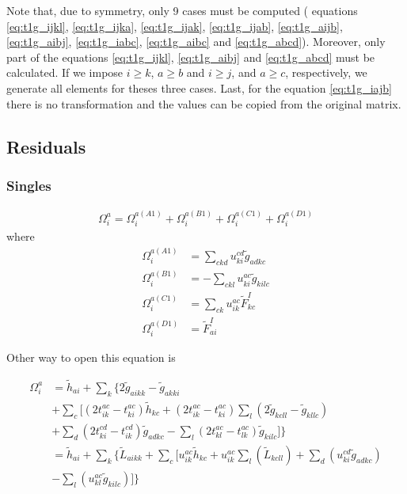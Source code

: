 Note that, due to symmetry, only 9 cases must be computed ( equations \ref{eq:t1g_ijkl}, \ref{eq:t1g_ijka}, \ref{eq:t1g_ijak}, \ref{eq:t1g_ijab}, \ref{eq:t1g_aijb}, \ref{eq:t1g_aibj}, \ref{eq:t1g_iabc}, \ref{eq:t1g_aibc} and \ref{eq:t1g_abcd}).
Moreover, only part of the equations \ref{eq:t1g_ijkl}, \ref{eq:t1g_aibj} and \ref{eq:t1g_abcd} must be calculated.
If we impose $i\ge k$, $a\ge b$ and $i\ge j$, and $a\ge c$, respectively, we generate all elements for theses three cases.
Last, for the equation \ref{eq:t1g_iajb} there is no transformation and the values can be copied from the original matrix.


\subsection{Residuals}
\hypertarget{sec:ccsd_res}{}
\label{sec:ccsd_res}

\subsubsection{Singles}
\hypertarget{sec:ccsd_res_sing}{}
\label{sec:ccsd_res_sing}


\begin{equation}
  \begin{split}
    \Omega_i^a=\Omega_i^{a(A1)}+\Omega_i^{a(B1)}+\Omega_i^{a(C1)}+\Omega_i^{a(D1)}
  \end{split}
\end{equation}
where
\begin{align}
  \Omega_i^{a(A1)}&=\sum_{ckd}u_{ki}^{cd}{\tilde g}_{adkc}\\
  \Omega_i^{a(B1)}&=-\sum_{ckl}u_{ki}^{ac}{\tilde g}_{kilc}\\
  \Omega_i^{a(C1)}&=\sum_{ck}u_{ik}^{ac}{\tilde F}_{kc}^{I}\\
  \Omega_i^{a(D1)}&={\tilde F}_{ai}^{I}
\end{align}

Other way to open this equation is

\begin{equation}
  \begin{split}
    \Omega_i^a&={\tilde h}_{ai}+\sum_k\{2{\tilde g}_{aikk}-{\tilde g}_{akki}\\
    &+\sum_c[(2t_{ik}^{ac}-t_{ki}^{ac}){\tilde h}_{kc}+(2t_{ik}^{ac}-t_{ki}^{ac})\sum_l(2{\tilde g}_{kcll}-{\tilde g}_{kllc})\\
    &+\sum_d(2t_{ki}^{cd}-t_{ik}^{cd}){\tilde g}_{adkc}-\sum_l(2t_{kl}^{ac}-t_{lk}^{ac}){\tilde g}_{kilc}]\}\\
    &={\tilde h}_{ai}+\sum_{k}\{{\tilde L}_{aikk}+\sum_c[u_{ik}^{ac}{\tilde h}_{kc}+u_{ik}^{ac}\sum_l({\tilde L}_{kcll})+\sum_d(u_{ki}^{cd}{\tilde g}_{adkc})\\
      &-\sum_l(u_{kl}^{ac}{\tilde g}_{kilc})]\}
   \end{split}
\end{equation}

